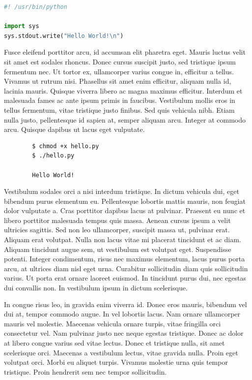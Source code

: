 \documentclass{article}
\begin{document}
\begin{file}[hello.py]
\begin{lstlisting}[language=Python]
#! /usr/bin/python

import sys
sys.stdout.write("Hello World!\n")
\end{lstlisting}
\end{file}

Fusce eleifend porttitor arcu, id accumsan elit pharetra eget. Mauris luctus velit sit amet est sodales rhoncus. Donec cursus suscipit justo, sed tristique ipsum fermentum nec. Ut tortor ex, ullamcorper varius congue in, efficitur a tellus. Vivamus ut rutrum nisi. Phasellus sit amet enim efficitur, aliquam nulla id, lacinia mauris. Quisque viverra libero ac magna maximus efficitur. Interdum et malesuada fames ac ante ipsum primis in faucibus. Vestibulum mollis eros in tellus fermentum, vitae tristique justo finibus. Sed quis vehicula nibh. Etiam nulla justo, pellentesque id sapien at, semper aliquam arcu. Integer at commodo arcu. Quisque dapibus ut lacus eget vulputate.

\begin{commandline}
	\begin{verbatim}
		$ chmod +x hello.py
		$ ./hello.py

		Hello World!
	\end{verbatim}
\end{commandline}

Vestibulum sodales orci a nisi interdum tristique. In dictum vehicula dui, eget bibendum purus elementum eu. Pellentesque lobortis mattis mauris, non feugiat dolor vulputate a. Cras porttitor dapibus lacus at pulvinar. Praesent eu nunc et libero porttitor malesuada tempus quis massa. Aenean cursus ipsum a velit ultricies sagittis. Sed non leo ullamcorper, suscipit massa ut, pulvinar erat. Aliquam erat volutpat. Nulla non lacus vitae mi placerat tincidunt et ac diam. Aliquam tincidunt augue sem, ut vestibulum est volutpat eget. Suspendisse potenti. Integer condimentum, risus nec maximus elementum, lacus purus porta arcu, at ultrices diam nisl eget urna. Curabitur sollicitudin diam quis sollicitudin varius. Ut porta erat ornare laoreet euismod. In tincidunt purus dui, nec egestas dui convallis non. In vestibulum ipsum in dictum scelerisque.

\begin{warn}[Notice:]
  In congue risus leo, in gravida enim viverra id. Donec eros mauris, bibendum vel dui at, tempor commodo augue. In vel lobortis lacus. Nam ornare ullamcorper mauris vel molestie. Maecenas vehicula ornare turpis, vitae fringilla orci consectetur vel. Nam pulvinar justo nec neque egestas tristique. Donec ac dolor at libero congue varius sed vitae lectus. Donec et tristique nulla, sit amet scelerisque orci. Maecenas a vestibulum lectus, vitae gravida nulla. Proin eget volutpat orci. Morbi eu aliquet turpis. Vivamus molestie urna quis tempor tristique. Proin hendrerit sem nec tempor sollicitudin.
\end{warn}

\end{document}
